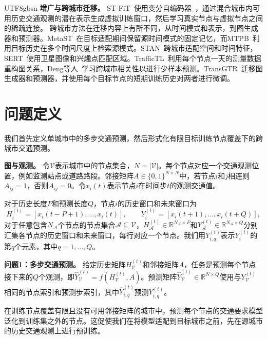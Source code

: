\documentclass[runningheads,a4paper]{llncs}
\begin{document}
\begin{CJK*}{UTF8}{gbsn}
\noindent\textbf{增广与跨城市迁移。}
ST-FiT~\cite{stfit}使用变分自编码器~\cite{vae}，通过混合城市内可用历史交通观测的潜在表示生成虚拟训练窗口，然后学习真实节点与虚拟节点之间的稀疏连接。
跨城市方法在迁移内容上有所不同，从时间模式和表示，到图生成器和预测器。MetaST~\cite{metast}在目标适配期间保留源时间模式的固定记忆，而MTPB~\cite{mtpb}利用目标历史在多个时间尺度上检索源模式。STAN~\cite{stan}跨城市适配空间和时间特征，SERT~\cite{sert}使用卫星图像和兴趣点匹配区域。TrafficTL~\cite{traffictl}利用每个节点一天的测量数据重构图关系，Deng等人~\cite{crosscity}学习跨城市相关性以进行少样本预测。TransGTR~\cite{transgtr}迁移图生成器和预测器，并使用每个目标节点的短期训练历史对两者进行微调。

\section{问题定义}\label{sec:problem}

我们首先定义单城市中的多步交通预测，然后形式化有限目标训练节点覆盖下的跨城市交通预测。

\noindent\textbf{图与观测。}
令$\mathcal V$表示城市中的节点集合，$N=|\mathcal V|$。每个节点对应一个交通观测位置，例如监测站点或道路路段。邻接矩阵$A\in\{0,1\}^{N\times N}$中，若节点$i$和$j$相连则$A_{ij}=1$，否则$A_{ij}=0$。令$x_i(t)$表示节点$i$在时间步$t$的观测交通值。

对于历史长度$P$和预测长度$Q$，节点$i$的历史窗口和未来窗口为
\begin{equation}
    H_i^{(t)}=[x_i(t-P+1),\ldots,x_i(t)],\qquad
    Y_i^{(t)}=[x_i(t+1),\ldots,x_i(t+Q)],
  \label{eq:forecast-windows}
\end{equation}
对于任意包含$N_{\mathcal A}$个节点的节点集合$\mathcal A\subseteq\mathcal V$，$H_{\mathcal A}^{(t)}\in\mathbb R^{N_{\mathcal A}\times P}$和$Y_{\mathcal A}^{(t)}\in\mathbb R^{N_{\mathcal A}\times Q}$分别汇集各节点的历史窗口和未来窗口，每行对应一个节点。我们用$Y_{i,q}^{(t)}$表示$Y_i^{(t)}$的第$q$个元素，其中$q=1,\ldots,Q$。


{\sloppy\noindent\par}

\noindent\textbf{问题1：多步交通预测。}
给定历史矩阵$H_{\mathcal V}^{(t)}$和邻接矩阵$A$，任务是预测每个节点接下来的$Q$个观测，即${\widehat Y_{\mathcal V}^{(t)}=f(H_{\mathcal V}^{(t)},A)}$。预测矩阵$\widehat Y_{\mathcal V}^{(t)}\in\mathbb R^{N\times Q}$使用与$Y_{\mathcal V}^{(t)}$相同的节点索引和预测步索引，其中$\widehat Y_{i,q}^{(t)}$预测$Y_{i,q}^{(t)}$。

在训练节点覆盖有限且没有可用邻接矩阵的城市中，预测每个节点的交通要求模型泛化到训练集之外的节点。这促使我们在将模型适配到目标城市之前，先在源城市的历史交通观测上进行预训练。


\end{CJK*}
\end{document}
